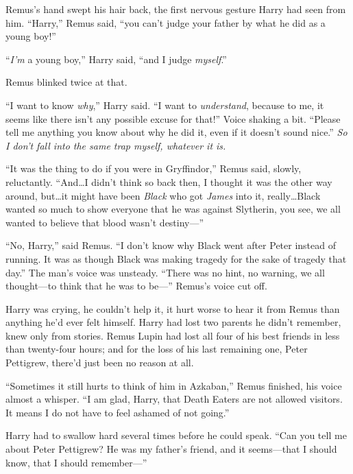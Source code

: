 Remus’s hand swept his hair back, the first nervous gesture Harry had seen from him.
“Harry,” Remus said, “you can’t judge your father by what he did as a young boy!”

“\emph{I’m} a young boy,” Harry said, “and I judge \emph{myself}.”

Remus blinked twice at that.

“I want to know \emph{why},” Harry said.
“I want to \emph{understand}, because to me, it seems like there isn’t any possible excuse for that!” Voice shaking a bit.
“Please tell me anything you know about why he did it, even if it doesn’t sound nice.” \emph{So I don’t fall into the same trap myself, whatever it is.}

“It was the thing to do if you were in Gryffindor,” Remus said, slowly, reluctantly.
“And…I didn’t think so back then, I thought it was the other way around, but…it might have been \emph{Black} who got \emph{James} into it, really…Black wanted so much to show everyone that he was against Slytherin, you see, we all wanted to believe that blood wasn’t destiny—”

\later

“No, Harry,” said Remus.
“I don’t know why Black went after Peter instead of running. It was as though Black was making tragedy for the sake of tragedy that day.” The man’s voice was unsteady.
“There was no hint, no warning, we all thought—to think that he was to be—” Remus’s voice cut off.

Harry was crying, he couldn’t help it, it hurt worse to hear it from Remus than anything he’d ever felt himself. Harry had lost two parents he didn’t remember, knew only from stories. Remus Lupin had lost all four of his best friends in less than twenty-four hours; and for the loss of his last remaining one, Peter Pettigrew, there’d just been no reason at all.

“Sometimes it still hurts to think of him in Azkaban,” Remus finished, his voice almost a whisper.
“I am glad, Harry, that Death Eaters are not allowed visitors. It means I do not have to feel ashamed of not going.”

Harry had to swallow hard several times before he could speak.
“Can you tell me about Peter Pettigrew? He was my father’s friend, and it seems—that I should know, that I should remember—”

